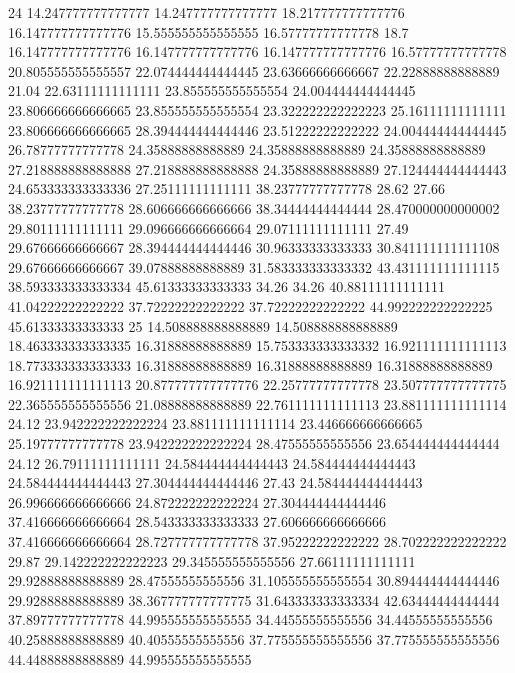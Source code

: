 24 14.247777777777777 14.247777777777777 18.217777777777776 16.147777777777776 15.555555555555555 16.57777777777778 18.7 16.147777777777776 16.147777777777776 16.147777777777776 16.57777777777778 20.805555555555557 22.074444444444445 23.63666666666667 22.22888888888889 21.04 22.63111111111111 23.855555555555554 24.004444444444445 23.806666666666665 23.855555555555554 23.322222222222223 25.16111111111111 23.806666666666665 28.394444444444446 23.51222222222222 24.004444444444445 26.78777777777778 24.35888888888889 24.35888888888889 24.35888888888889 27.218888888888888 27.218888888888888 24.35888888888889 27.124444444444443 24.653333333333336 27.25111111111111 38.23777777777778 28.62 27.66 38.23777777777778 28.606666666666666 38.34444444444444 28.470000000000002 29.80111111111111 29.096666666666664 29.07111111111111 27.49 29.67666666666667 28.394444444444446 30.96333333333333 30.841111111111108 29.67666666666667 39.07888888888889 31.583333333333332 43.431111111111115 38.593333333333334 45.61333333333333 34.26 34.26 40.88111111111111 41.04222222222222 37.72222222222222 37.72222222222222 44.992222222222225 45.61333333333333
25 14.508888888888889 14.508888888888889 18.463333333333335 16.31888888888889 15.753333333333332 16.921111111111113 18.773333333333333 16.31888888888889 16.31888888888889 16.31888888888889 16.921111111111113 20.877777777777776 22.25777777777778 23.507777777777775 22.365555555555556 21.08888888888889 22.761111111111113 23.881111111111114 24.12 23.942222222222224 23.881111111111114 23.446666666666665 25.19777777777778 23.942222222222224 28.47555555555556 23.654444444444444 24.12 26.79111111111111 24.584444444444443 24.584444444444443 24.584444444444443 27.304444444444446 27.43 24.584444444444443 26.996666666666666 24.872222222222224 27.304444444444446 37.416666666666664 28.543333333333333 27.606666666666666 37.416666666666664 28.727777777777778 37.95222222222222 28.702222222222222 29.87 29.142222222222223 29.345555555555556 27.66111111111111 29.92888888888889 28.47555555555556 31.105555555555554 30.894444444444446 29.92888888888889 38.367777777777775 31.643333333333334 42.63444444444444 37.89777777777778 44.995555555555555 34.44555555555556 34.44555555555556 40.25888888888889 40.40555555555556 37.775555555555556 37.775555555555556 44.44888888888889 44.995555555555555
